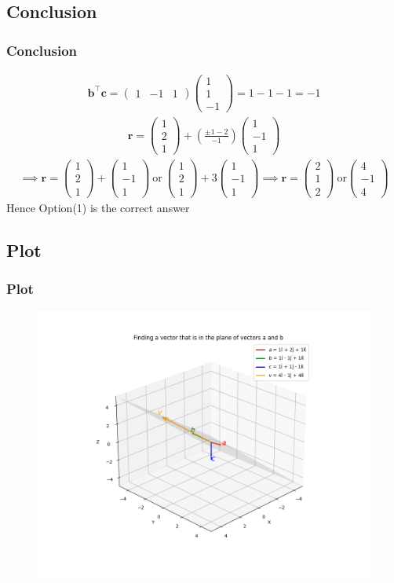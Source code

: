 \documentclass{beamer}
\providecommand{\brak}[1]{\ensuremath{\left(#1\right)}}
\theoremstyle{remark}
\newcommand{\myvec}[1]{\ensuremath{\begin{pmatrix}#1\end{pmatrix}}}
\let\vec\mathbf
\numberwithin{equation}{section}
\begin{document}
\subsection{Conclusion}
\begin{frame}
\frametitle{Conclusion}
\begin{align}
\vec{b}^\top\vec{c}=\myvec{1&-1&1}\myvec{1\\1\\-1}=1-1-1=-1
\end{align}
\begin{align}
\vec{r}=\myvec{1\\2\\1}+\brak{\frac{\pm1-2}{-1}}\myvec{1\\-1\\1} 
\end{align}
\begin{align}
\implies \vec{r}=\myvec{1\\2\\1}+\myvec{1\\-1\\1}\ \text{or}\ \myvec{1\\2\\1}+3\myvec{1\\-1\\1}
\implies \vec{r}=\myvec{2\\1\\2}\ \text{or} \myvec{4\\-1\\4}
\end{align}
Hence Option(1) is the correct answer
\end{frame}

\subsection{Plot}
\begin{frame}[fragile]
\frametitle{Plot}

\begin{figure}[h!]
   \centering
   \includegraphics[width=0.7\columnwidth]{figs/fig1.png}
	\caption{}
   \label{}
\end{figure}
\end{frame}
\end{document}
